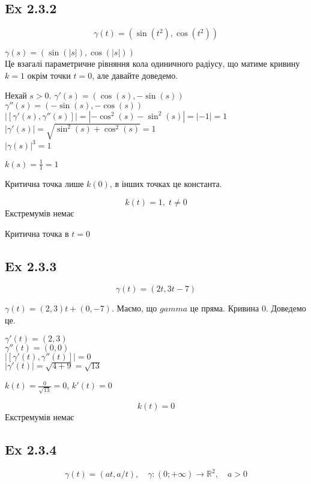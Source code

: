 \documentclass[10pt, a4paper]{article} %
\newcommand{\R}{\mathbb{R}}
\begin{document}
\subsection*{Ex 2.3.2}
\[\gamma(t) = (\sin(t^2), \cos(t^2))\]

$\gamma(s) = (\sin(|s|), \cos(|s|))$\\
Це взагалі параметричне рівняння кола одиничного радіусу, 
що матиме кривину $k=1$ окрім точки $t=0$, але давайте доведемо.

Нехай $s>0$.
$\gamma'(s) = (\cos(s), -\sin(s))$\\
$\gamma''(s) = (-\sin(s), -\cos(s))$\\
$|[\gamma'(s), \gamma''(s)]| = |-\cos^2(s)-\sin^2(s)| = |-1| = 1$\\
$|\gamma'(s)| = \sqrt{\sin^2(s) + \cos^2(s)} = 1$\\
$|\gamma(s)|^{3} = 1$

$k(s) = \frac{1}{1} = 1$

Критична точка лише $k(0)$, в інших точках це константа. 

\begin{mdframed}[backgroundcolor=green!20]
    \[k(t) = 1, \; t\ne 0\]
    Екстремумів немає

    Критична точка в $t=0$
\end{mdframed}


\subsection*{Ex 2.3.3}
\[\gamma(t) = (2t, 3t-7)\]

$\gamma(t) = (2, 3) t + (0, -7)$. Маємо, що $gamma$ це пряма. Кривина 0. Доведемо це.

$\gamma'(t) = (2, 3)$\\
$\gamma''(t) = (0, 0)$\\
$|[\gamma'(t), \gamma''(t)]| = 0$\\
$|\gamma'(t)| = \sqrt{4+9} = \sqrt{13}$

$k(t) = \frac{0}{\sqrt{13}} = 0$,
$k'(t) = 0$\\

\begin{mdframed}[backgroundcolor=green!20]
    \[k(t) = 0\]
    Екстремумів немає
\end{mdframed}

\newpage
\subsection*{Ex 2.3.4}
\[\gamma(t) = (at, a/t), \quad \gamma : (0;+\infty) \to \R^2, \quad a>0\]
\end{document}
